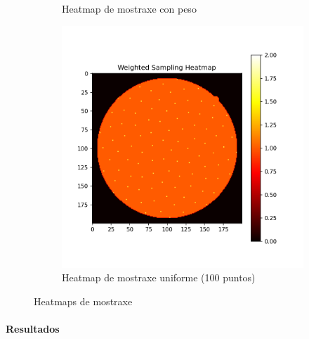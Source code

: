 \begin{figure}[ht]
\begin{subfigure}[b]{0.3\textwidth}
        \caption{Heatmap de mostraxe con peso}
        \label{fig:weighted_sampling_heatmap}
    \end{subfigure}
    \hfill
    \begin{subfigure}[b]{0.3\textwidth}
        \centering
        \includegraphics[width=\textwidth]{imaxes/muestraje/uniform_sampling_heatmap.png}
        \caption{Heatmap de mostraxe uniforme (100 puntos)}
        \label{fig:uniform_sampling_heatmap}
    \end{subfigure}
    \caption{Heatmaps de mostraxe}
    \label{fig:sampling_heatmaps}
\end{figure}


\paragraph{Resultados}
\label{par:Resultados-sampling}

